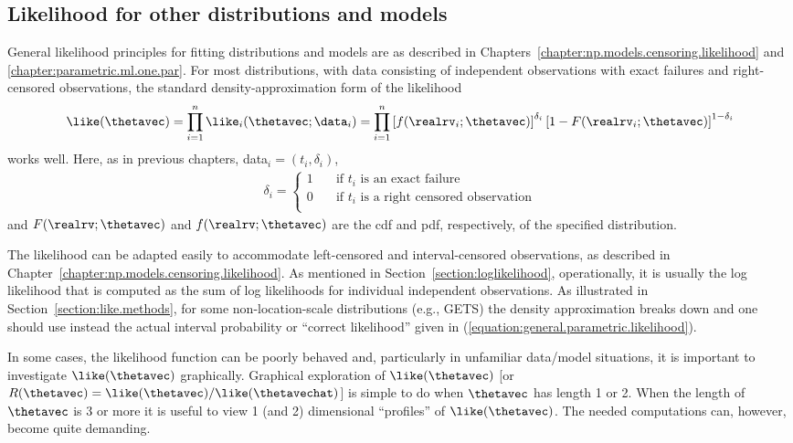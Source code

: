 \subsection{Likelihood for other distributions and models}
General likelihood principles for fitting distributions and models
are as described in
Chapters~\ref{chapter:np.models.censoring.likelihood} and
\ref{chapter:parametric.ml.one.par}. 
For most distributions,
with data consisting of independent observations with exact failures
and right-censored observations, the standard density-approximation
form of the likelihood
\begin{equation}
\label{equation:general.parametric.den.likelihood}
\like(\thetavec) = \prod_{i=1}^{n} \like_{i}(\thetavec;\data_{i}) 
=
  \prod_{i=1}^{n}    
 \left [ 
 f(\realrv_{i};\thetavec)
\right ]^{\delta_{i}} 
\left [1- F(\realrv_{i};\thetavec) \right]^{1-\delta_{i}}
\end{equation}
works well. Here, as in previous chapters, 
data$_{i}=(t_{i}, \delta_{i})$,
\begin{eqnarray*}
\delta_{i}= \left \{
     \begin{array}{lll}
	1 & \quad \mbox{if $t_{i}$ is an exact failure} \\
        0 & \quad \mbox{if $t_{i}$ is a right censored  observation} \\
     \end{array}
            \right .
\end{eqnarray*}
and $F(\realrv;\thetavec)$ and
$f(\realrv;\thetavec)$ are the cdf and pdf, respectively, of the
specified distribution.

The likelihood can be adapted easily to accommodate left-censored
and interval-censored observations, as described in
Chapter~\ref{chapter:np.models.censoring.likelihood}.  As mentioned
in Section~\ref{section:loglikelihood}, operationally, it is usually
the log likelihood that is computed as the sum of log likelihoods for
individual independent observations. As illustrated in
Section~\ref{section:like.methods}, for some non-location-scale
distributions (e.g., GETS) the density approximation breaks down and
one should use instead the actual interval probability or ``correct
likelihood'' given in
(\ref{equation:general.parametric.likelihood}).

In some cases, the likelihood function can be poorly behaved and,
particularly in unfamiliar data/model situations, it is important to
investigate $\like(\thetavec)$ graphically.  Graphical exploration
of $\like(\thetavec)$ [or
$R(\thetavec)=\like(\thetavec)/\like(\thetavechat)$] is simple to do
when $\thetavec$ has length 1 or 2.  When the length of $\thetavec$
is 3 or more it is useful to view 1 (and 2) dimensional ``profiles''
of $\like(\thetavec)$. The needed computations can, however, become
quite demanding.

